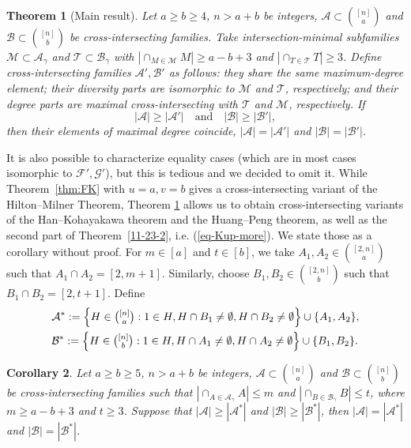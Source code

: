 \documentclass[11pt]{article}
\newcommand{\m}{\mathcal}
\newtheorem{theorem}{Theorem}[section]
\newtheorem{corollary}[theorem]{Corollary}
\begin{document}
\begin{theorem}[Main result]\label{thm:main}
Let $a\ge b\ge 4$, $n> a+b$ be integers, $\mathcal{A}\subset {[n]\choose a}$ and $\mathcal{B}\subset {[n]\choose b}$ be cross-intersecting families. 
Take intersection-minimal subfamilies $\mathcal{M}\subset \mathcal{A}_\gamma$ and $\mathcal{T}\subset \mathcal{B}_\gamma$ with $|\cap_{M\in \mathcal{M}}M|\ge a-b+3$ and $|\cap_{T\in \mathcal{T}}T|\ge 3$.
Define cross-intersecting families $\mathcal{A}',\mathcal{B}'$ as follows:
they share the same maximum-degree element; 
their diversity parts are isomorphic to $\mathcal{M}$ and $\mathcal{T}$, respectively; 
 and their degree parts are maximal cross-intersecting with $\m T$ and $\m M$, respectively. 
 If 
\[ |\mathcal{A}|\ge |\mathcal{A}'|  \quad \text{and} \quad |\mathcal{B}|\ge |\mathcal{B}'|, \] 
 then their elements of maximal degree coincide, $|\mathcal{A}|= |\mathcal{A}'|$ and $|\mathcal{B}|= |\mathcal{B}'|$. 
\end{theorem}


It is also possible to characterize equality cases (which are in most cases isomorphic to $\m F', \m G'$), but this is tedious and we decided to omit it. While Theorem~\ref{thm:FK} with $u=a, v=b$ gives a cross-intersecting variant of the Hilton--Milner Theorem,
Theorem \ref{thm:main} allows us to obtain cross-intersecting variants of the Han--Kohayakawa theorem and the Huang--Peng theorem, as well as the second part of Theorem~\ref{11-23-2}, i.e. (\ref{eq-Kup-more}). We state those as a corollary without proof. 
For $m \in [a]$ and $t \in [b]$,
we take $A_1, A_2\in {[2,n]\choose a}$ such that $A_1\cap A_2=[2,m+1]$. 
Similarly, choose $B_1, B_2\in {[2,n]\choose b}$ such that $B_1\cap B_2=[2,t+1]$.
Define
\begin{align*}
&\mathcal{A}^* :=\Big\{H\in \tbinom{[n]}{a}: 1\in H, H\cap B_1 \ne \emptyset, H\cap B_2 \ne \emptyset \Big\} \cup \{A_1, A_2\},\\
&\mathcal{B}^* :=\Big\{H\in \tbinom{[n]}{ b}: 1\in H, H\cap A_1 \ne \emptyset, H\cap A_2 \ne \emptyset \Big\} \cup \{B_1, B_2\}.
\end{align*}


\begin{corollary}\label{12-4-1}
Let $a\ge b\ge 5$, $n> a+b$ be integers, $\mathcal{A}\subset {[n]\choose a}$ and $\mathcal{B}\subset {[n]\choose b}$ be cross-intersecting families  
such that $|\cap_{A\in \mathcal{A}_\gamma}A|\le m$ and $|\cap_{B\in \mathcal{B}_\gamma}B|\le t$, where $m\ge a-b+3$ and $t\ge 3$.
Suppose that $|\mathcal{A}|\ge |\mathcal{A}^*|$ and $|\mathcal{B}|\ge |\mathcal{B}^*|$, then $|\mathcal{A}|=|\mathcal{A}^*|$ and $|\mathcal{B}|=|\mathcal{B}^* |$.
\end{corollary}
\end{document}
